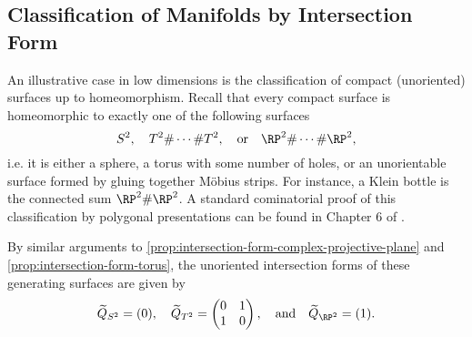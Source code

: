 \subsection{Classification of Manifolds by Intersection Form}
An illustrative case in low dimensions is the classification of compact (unoriented) surfaces up to homeomorphism. Recall that every compact surface is homeomorphic to exactly one of the following surfaces
\[
	S^2,\quad T^2\#\cdots\# T^2,\quad\textrm{or}\quad \RP^2\#\cdots\# \RP^2,
\]
i.e. it is either a sphere, a torus with some number of holes, or an unorientable surface formed by gluing together M\"obius strips. For instance, a Klein bottle is the connected sum $\RP^2\#\RP^2$.
A standard cominatorial proof of this classification by polygonal presentations can be found in Chapter 6 of \cite{lee2011topological}.

By similar arguments to \cref{prop:intersection-form-complex-projective-plane} and \cref{prop:intersection-form-torus}, the unoriented intersection forms of these generating surfaces are given by
\[
	\widetilde{Q}_{S^2}=(0),\quad \widetilde{Q}_{T^2}=\begin{pmatrix}0 & 1 \\ 1 & 0\end{pmatrix},\quad \textrm{and}\quad\widetilde{Q}_{\RP^2} = (1).
\]

